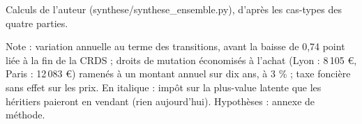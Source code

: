 Calculs de l'auteur (synthese/synthese\_ensemble.py), d'après les cas-types des quatre parties.\par Note : variation annuelle au terme des transitions, avant la baisse de 0,74 point liée à la fin de la CRDS ; droits de mutation économisés à l'achat (Lyon : 8\,105 \euro{}, Paris : 12\,083 \euro{}) ramenés à un montant annuel sur dix ans, à 3 \% ; taxe foncière sans effet sur les prix. En italique : impôt sur la plus-value latente que les héritiers paieront en vendant (rien aujourd'hui). Hypothèses : annexe de méthode.
